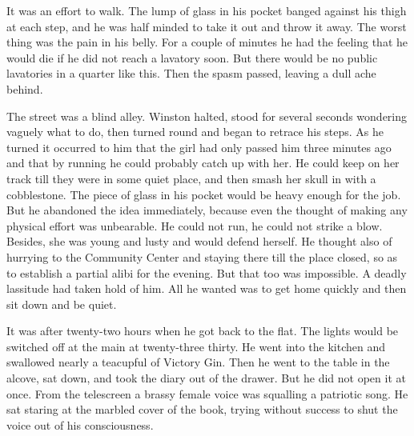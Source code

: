 It was an effort to walk. The lump of glass in his pocket banged against
his thigh at each step, and he was half minded to take it out and throw
it away. The worst thing was the pain in his belly. For a couple of
minutes he had the feeling that he would die if he did not reach a
lavatory soon. But there would be no public lavatories in a quarter like
this. Then the spasm passed, leaving a dull ache behind.

The street was a blind alley. Winston halted, stood for several seconds
wondering vaguely what to do, then turned round and began to retrace his
steps. As he turned it occurred to him that the girl had only passed him
three minutes ago and that by running he could probably catch up with
her. He could keep on her track till they were in some quiet place, and
then smash her skull in with a cobblestone. The piece of glass in his
pocket would be heavy enough for the job. But he abandoned the idea
immediately, because even the thought of making any physical effort was
unbearable. He could not run, he could not strike a blow. Besides, she
was young and lusty and would defend herself. He thought also of
hurrying to the Community Center and staying there till the place
closed, so as to establish a partial alibi for the evening. But that too
was impossible. A deadly lassitude had taken hold of him. All he wanted
was to get home quickly and then sit down and be quiet.

It was after twenty-two hours when he got back to the flat. The lights
would be switched off at the main at twenty-three thirty. He went into
the kitchen and swallowed nearly a teacupful of Victory Gin. Then he
went to the table in the alcove, sat down, and took the diary out of the
drawer. But he did not open it at once. From the telescreen a brassy
female voice was squalling a patriotic song. He sat staring at the
marbled cover of the book, trying without success to shut the voice out
of his consciousness.

